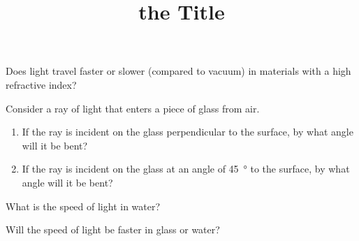 \documentclass[letterpaper,10pt]{article}
\title{the Title}
\author{}
\date{}
\begin{document}
\maketitle

\begin{enumerate}
\begin{minipage}{\linewidth}
  \item  \label{prob_1} Does light travel faster or slower (compared to vacuum) in materials with a high refractive index? 
\end{minipage}
\begin{minipage}{\linewidth}
  \item  \label{prob_2} Consider a ray of light that enters a piece of glass from air. 
    \begin{enumerate}
      \item  \label{prob_2_1} If the ray is incident on the glass perpendicular to the surface, by what angle will it be bent? 
      \item  \label{prob_2_2} If the ray is incident on the glass at an angle of \SI{45}{\degree} to the surface, by what angle will it be bent? 
    \end{enumerate}
\end{minipage}
\begin{minipage}{\linewidth}
  \item  \label{prob_3} What is the speed of light in water? 
\end{minipage}
\begin{minipage}{\linewidth}
  \item  \label{prob_4} Will the speed of light be faster in glass or water? 
\end{minipage}
\end{enumerate}


\clearpage
\end{document}
